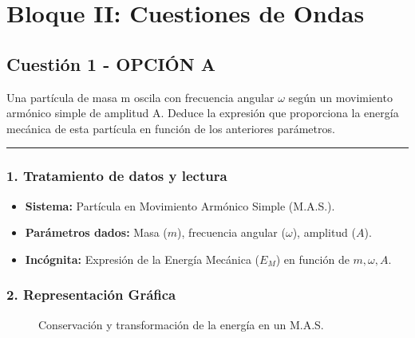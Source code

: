 \newpage

\section{Bloque II: Cuestiones de Ondas}
\label{sec:ondas_2006_jun_ord}

\subsection{Cuestión 1 - OPCIÓN A}
\label{subsec:2A_2006_jun_ord}

\begin{cajaenunciado}
Una partícula de masa m oscila con frecuencia angular $\omega$ según un movimiento armónico simple de amplitud A. Deduce la expresión que proporciona la energía mecánica de esta partícula en función de los anteriores parámetros.
\end{cajaenunciado}
\hrule

\subsubsection*{1. Tratamiento de datos y lectura}
\begin{itemize}
    \item \textbf{Sistema:} Partícula en Movimiento Armónico Simple (M.A.S.).
    \item \textbf{Parámetros dados:} Masa ($m$), frecuencia angular ($\omega$), amplitud ($A$).
    \item \textbf{Incógnita:} Expresión de la Energía Mecánica ($E_M$) en función de $m, \omega, A$.
\end{itemize}

\subsubsection*{2. Representación Gráfica}
\begin{figure}[H]
    \centering
    \caption{Conservación y transformación de la energía en un M.A.S.}
\end{figure}

